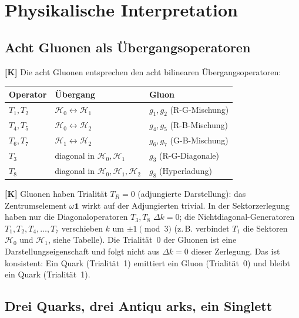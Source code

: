 \section{Physikalische Interpretation}

\subsection{Acht Gluonen als Übergangsoperatoren}

\textbf{[K]} Die acht Gluonen entsprechen den acht bilinearen
Übergangsoperatoren:
\begin{center}
\begin{tabular}{lll}
\toprule
Operator & Übergang & Gluon \\
\midrule
$T_1, T_2$ & $\mathcal{H}_0 \leftrightarrow \mathcal{H}_1$
  & $g_1, g_2$ (R-G-Mischung) \\
$T_4, T_5$ & $\mathcal{H}_0 \leftrightarrow \mathcal{H}_2$
  & $g_4, g_5$ (R-B-Mischung) \\
$T_6, T_7$ & $\mathcal{H}_1 \leftrightarrow \mathcal{H}_2$
  & $g_6, g_7$ (G-B-Mischung) \\
$T_3$      & diagonal in $\mathcal{H}_0, \mathcal{H}_1$
  & $g_3$ (R-G-Diagonale) \\
$T_8$      & diagonal in $\mathcal{H}_0, \mathcal{H}_1, \mathcal{H}_2$
  & $g_8$ (Hyperladung) \\
\bottomrule
\end{tabular}
\end{center}

\textbf{[K]} Gluonen haben Trialität $T_R = 0$ (adjungierte Darstellung):
das Zentrumselement $\omega\mathbf{1}$ wirkt auf der Adjungierten trivial.
In der Sektorzerlegung haben nur die Diagonaloperatoren $T_3, T_8$
$\Delta k = 0$; die Nichtdiagonal-Generatoren $T_1, T_2, T_4, \ldots, T_7$
verschieben $k$ um $\pm 1 \pmod{3}$ (z.\,B. verbindet $T_1$ die Sektoren
$\mathcal{H}_0$ und $\mathcal{H}_1$, siehe Tabelle). Die Trialität~0 der
Gluonen ist eine Darstellungseigenschaft und folgt nicht aus $\Delta k = 0$
dieser Zerlegung.
Das ist konsistent: Ein Quark (Trialität~1) emittiert ein Gluon
(Trialität~0) und bleibt ein Quark (Trialität~1).

\subsection{Drei Quarks, drei Antiqu arks, ein Singlett}

